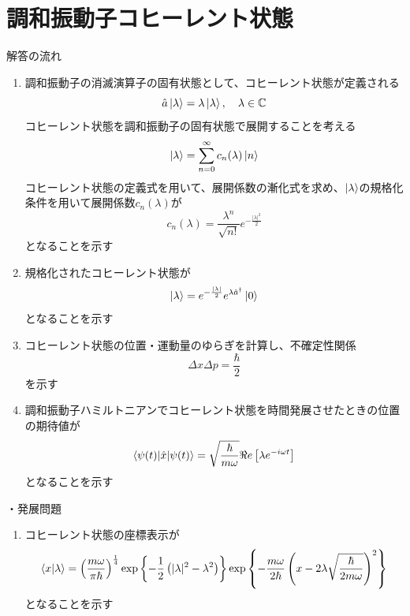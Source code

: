 \documentclass{jsarticle}  %
\numberwithin{equation}{section} %
\numberwithin{figure}{section}
\begin{document}
\section{調和振動子コヒーレント状態}
    \begin{itembox}[l]{\large{解答の流れ}}
        \begin{enumerate}
            \item 調和振動子の消滅演算子の固有状態として、コヒーレント状態が定義される
            \[ \hat{a} \ket{\lambda} = \lambda \ket{\lambda},\quad \lambda \in \mathbb{C} \]
            コヒーレント状態を調和振動子の固有状態で展開することを考える
            \[ \ket{\lambda} = \sum_{n=0}^{\infty} c_n(\lambda) \ket{n} \]
            コヒーレント状態の定義式を用いて、展開係数の漸化式を求め、$\ket{\lambda}$の規格化条件を用いて展開係数$c_n(\lambda)$が
            \[ c_n(\lambda) = \frac{\lambda^n}{\sqrt{n!}} e^{-\frac{|\lambda|^2}{2} } \]
            となることを示す
            \item 規格化されたコヒーレント状態が
            \[ \ket{\lambda} = e^{-\frac{|\lambda|}{2}} e^{\lambda \hat{a}^\dagger} \ket{0} \]
            となることを示す
            \item コヒーレント状態の位置・運動量のゆらぎを計算し、不確定性関係
            \[ \Delta x\Delta p = \frac{\hbar }{2} \]
            を示す
            \item 調和振動子ハミルトニアンでコヒーレント状態を時間発展させたときの位置の期待値が
            \[ \braket{\psi(t)|\hat{x}|\psi(t)} = \sqrt{\frac{\hbar}{m\omega}} \Re e\left[ \lambda e^{-i\omega t} \right] \]
            となることを示す
        \end{enumerate}
        ・発展問題
        \begin{enumerate}
            \item コヒーレント状態の座標表示が
            \[ \braket{x|\lambda} = \left( \frac{m\omega}{\pi \hbar} \right)^\frac{1}{4} \exp\left\{ -\frac{1}{2}\left( |\lambda|^2 - \lambda^2 \right) \right\} \exp\left\{ -\frac{m\omega}{2\hbar} \left( x - 2\lambda \sqrt{\frac{\hbar}{2m\omega}} \right)^2 \right\} \]
            となることを示す
        \end{enumerate}
    \end{itembox}
\end{document}
